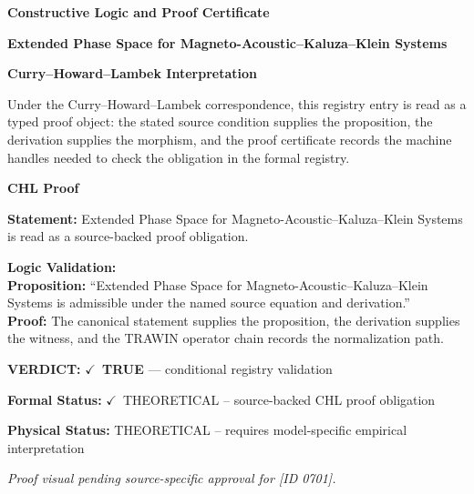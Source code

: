 \clearpage
\begingroup\tzpsupportsetup
\noindent\textbf{\fontsize{10.8pt}{12.8pt}\selectfont [ID 0701] Constructive Logic and Proof Certificate}\par
\noindent\textbf{\fontsize{10pt}{12pt}\selectfont Extended Phase Space for Magneto-Acoustic--Kaluza--Klein Systems}\par
\vspace{0.45em}
\begingroup
\footnotesize
\setlength{\parskip}{0.22em}
\setlength{\parindent}{0pt}
\noindent\textbf{Curry--Howard--Lambek Interpretation}\par
Under the Curry--Howard--Lambek correspondence, this registry entry is read as a typed proof
object: the stated source condition supplies the proposition, the derivation supplies the
morphism, and the proof certificate records the machine handles needed to check the obligation
in the formal registry.

\vspace{0.45em}
\noindent\textbf{CHL Proof}\par
\textbf{Statement:} Extended Phase Space for Magneto-Acoustic--Kaluza--Klein Systems is read as a source-backed proof obligation.

\textbf{Logic Validation:}\\
\textbf{Proposition:} ``Extended Phase Space for Magneto-Acoustic--Kaluza--Klein Systems is admissible under the named source equation and derivation.''\\
\textbf{Proof:} The canonical statement supplies the proposition, the derivation supplies the witness, and the TRAWIN operator chain records the normalization path.

\textbf{VERDICT:} \ensuremath{\checkmark}\ \textbf{TRUE} --- conditional registry validation

\textbf{Formal Status:} \ensuremath{\checkmark}\ THEORETICAL -- source-backed CHL proof obligation

\textbf{Physical Status:} THEORETICAL -- requires model-specific empirical interpretation
\par\vspace{0.45em}
\par
\vfill
\begingroup\footnotesize\itshape
Proof visual pending source-specific approval for [ID 0701].
\par\endgroup
\vfill
\endgroup
\endgroup
